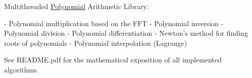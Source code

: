 Multithreaded \mbox{\hyperlink{class_polynomial}{Polynomial}} Arithmetic Library\+: \begin{DoxyVerb}- Polynomial multiplication based on the FFT
- Polynomial inversion
- Polynomial division 
- Polynomial differentiation
- Newton's method for finding roots of polynomials
- Polynomial interpolation (Lagrange)
\end{DoxyVerb}


See {\ttfamily R\+E\+A\+D\+M\+E.\+pdf} for the mathematical exposition of all implemented algorithms. 